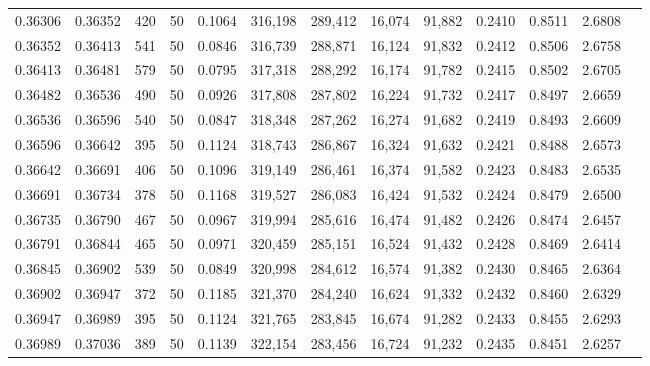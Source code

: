 \begin{tabular}{rrrrrrrrrrrrr}
0.36306 & 0.36352 &   420 &  50 &                                     0.1064 & 316,198 & 289,412 &  16,074 &  91,882 & 0.2410 & 0.8511 & 2.6808 \\
0.36352 & 0.36413 &   541 &  50 &                                     0.0846 & 316,739 & 288,871 &  16,124 &  91,832 & 0.2412 & 0.8506 & 2.6758 \\
0.36413 & 0.36481 &   579 &  50 &                                     0.0795 & 317,318 & 288,292 &  16,174 &  91,782 & 0.2415 & 0.8502 & 2.6705 \\
0.36482 & 0.36536 &   490 &  50 &                                     0.0926 & 317,808 & 287,802 &  16,224 &  91,732 & 0.2417 & 0.8497 & 2.6659 \\
0.36536 & 0.36596 &   540 &  50 &                                     0.0847 & 318,348 & 287,262 &  16,274 &  91,682 & 0.2419 & 0.8493 & 2.6609 \\
0.36596 & 0.36642 &   395 &  50 &                                     0.1124 & 318,743 & 286,867 &  16,324 &  91,632 & 0.2421 & 0.8488 & 2.6573 \\
0.36642 & 0.36691 &   406 &  50 &                                     0.1096 & 319,149 & 286,461 &  16,374 &  91,582 & 0.2423 & 0.8483 & 2.6535 \\
0.36691 & 0.36734 &   378 &  50 &                                     0.1168 & 319,527 & 286,083 &  16,424 &  91,532 & 0.2424 & 0.8479 & 2.6500 \\
0.36735 & 0.36790 &   467 &  50 &                                     0.0967 & 319,994 & 285,616 &  16,474 &  91,482 & 0.2426 & 0.8474 & 2.6457 \\
0.36791 & 0.36844 &   465 &  50 &                                     0.0971 & 320,459 & 285,151 &  16,524 &  91,432 & 0.2428 & 0.8469 & 2.6414 \\
0.36845 & 0.36902 &   539 &  50 &                                     0.0849 & 320,998 & 284,612 &  16,574 &  91,382 & 0.2430 & 0.8465 & 2.6364 \\
0.36902 & 0.36947 &   372 &  50 &                                     0.1185 & 321,370 & 284,240 &  16,624 &  91,332 & 0.2432 & 0.8460 & 2.6329 \\
0.36947 & 0.36989 &   395 &  50 &                                     0.1124 & 321,765 & 283,845 &  16,674 &  91,282 & 0.2433 & 0.8455 & 2.6293 \\
0.36989 & 0.37036 &   389 &  50 &                                     0.1139 & 322,154 & 283,456 &  16,724 &  91,232 & 0.2435 & 0.8451 & 2.6257 \\

\end{tabular}
